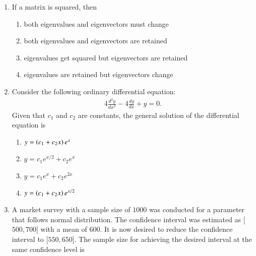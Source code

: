 \documentclass[journal,12pt,onecolumn]{IEEEtran}
\theoremstyle{remark}
\begin{document}
\begin{enumerate}
    \hfill{}

    \item If a matrix is squared, then

    \hfill{}
    \begin{enumerate}
        \item both eigenvalues and eigenvectors must change
        \item both eigenvalues and eigenvectors are retained
        \item eigenvalues get squared but eigenvectors are retained
        \item eigenvalues are retained but eigenvectors change
    \end{enumerate}

    \item Consider the following ordinary differential equation:
    \begin{align*}
        4\frac{d^{2}y}{dx^{2}}-4\frac{dy}{dx}+y=0.
    \end{align*}
    Given that $c_{1}$ and $c_{2}$ are constants, the general solution of the differential equation is

    \hfill{}
    \begin{enumerate}
        \item $y=\left(c_{1}+c_{2}x\right)e^{x}$
        \item $y=c_{1}e^{x/2}+c_{2}e^{x}$
        \item $y=c_{1}e^{x}+c_{2}e^{2x}$
        \item $y=\left(c_{1}+c_{2}x\right)e^{x/2}$
    \end{enumerate}

    \item A market survey with a sample size of $1000$ was conducted for a parameter that follows normal distribution. The confidence interval was estimated as [$500, 700$] with a mean of $600$. It is now desired to reduce the confidence interval to [$550, 650$]. The sample size for achieving the desired interval at the same confidence level is

    \hfill{}
    \begin{enumerate}
    \end{enumerate}


\end{enumerate}
\end{document}
